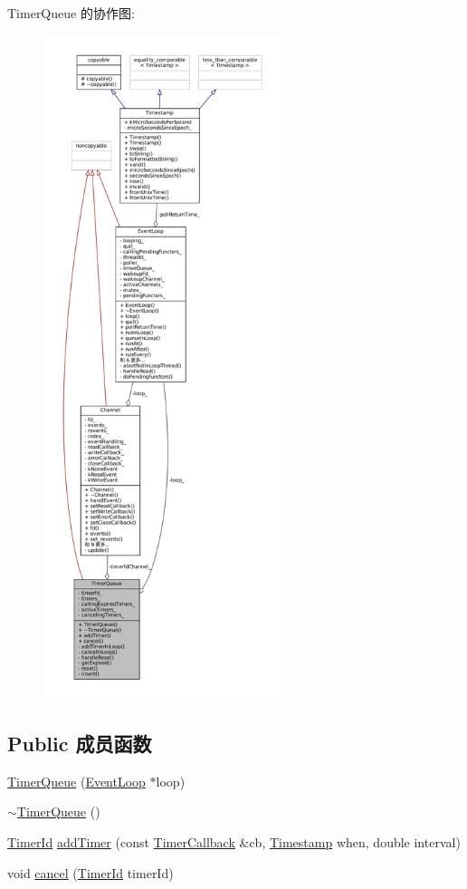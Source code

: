Timer\+Queue 的协作图\+:
\nopagebreak
\begin{figure}[H]
\begin{center}
\leavevmode
\includegraphics[height=550pt]{classmuduo_1_1TimerQueue__coll__graph}
\end{center}
\end{figure}
\subsection*{Public 成员函数}
\begin{DoxyCompactItemize}
\item 
\hyperlink{classmuduo_1_1TimerQueue_a7ad41aed2409f7d424fd9cf7c0c5eac8}{Timer\+Queue} (\hyperlink{classmuduo_1_1EventLoop}{Event\+Loop} $\ast$loop)
\item 
\hyperlink{classmuduo_1_1TimerQueue_a31b74dd52d3bff8688adcbbddc932901}{$\sim$\+Timer\+Queue} ()
\item 
\hyperlink{classmuduo_1_1TimerId}{Timer\+Id} \hyperlink{classmuduo_1_1TimerQueue_af1bd2f1010adf1a82120c708b7a1ba22}{add\+Timer} (const \hyperlink{namespacemuduo_a5f7453c2a15825e79bddf5deaec707bf}{Timer\+Callback} \&cb, \hyperlink{classmuduo_1_1Timestamp}{Timestamp} when, double interval)
\item 
void \hyperlink{classmuduo_1_1TimerQueue_af8b24b02bbff6a657fa5b0190bef9b9b}{cancel} (\hyperlink{classmuduo_1_1TimerId}{Timer\+Id} timer\+Id)
\end{DoxyCompactItemize}
